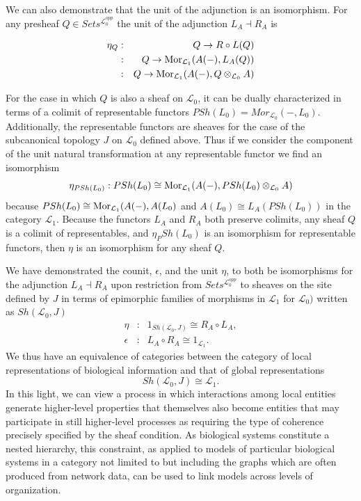 \documentclass[aps,twocolumn]{revtex4-1}
\begin{document}
We can also demonstrate that the unit of the adjunction is an isomorphism. For any presheaf $Q \in Sets^{\mathcal{L}_0^{opp}}$ the unit of the adjunction $L_A \dashv R_A$ is 

\begin{eqnarray*}
\eta_{Q} &:& Q \rightarrow R \circ L(Q)\\
&:& Q \rightarrow \mathop{\rm Mor}\nolimits_{\mathcal{L}_1}(A(-),L_A(Q))\\ 
&:& Q \rightarrow \mathop{\rm Mor}\nolimits_{\mathcal{L}_1}(A(-), Q \otimes_{\mathcal{L}_0} A)
\end{eqnarray*}

For the case in which $Q$ is also a sheaf on $\mathcal{L}_0$, it can be dually characterized in terms of a colimit of representable functors $PSh(L_0) = Mor_{\mathcal{L}_0}(-,L_0)$. Additionally, the representable functors are sheaves for the case of the subcanonical topology $J$ on $\mathcal{L}_0$ defined above. Thus if we consider the component of the unit natural transformation at any representable functor we find an isomorphism
$$
\eta_{PSh(L_0)}: PSh(L_0) \cong \mathop{\rm Mor}\nolimits_{\mathcal{L}_1}(A(-), PSh(L_0) \otimes_{\mathcal{L}_0} A)
$$
because $PSh(L_0) \cong \mathop{\rm Mor}\nolimits_{\mathcal{L}_1}(A(-), A(L_0)$ and $A(L_0) \cong L_A(PSh(L_0))$ in the category $\mathcal{L}_1$. Because the functors $L_A$ and $R_A$ both preserve colimits, any sheaf $Q$ is a colimit of representables, and $\eta_PSh(L_0)$ is an isomorphism for representable functors, then $\eta$ is an isomorphism for any sheaf $Q$.

We have demonstrated the counit, $\epsilon$, and the unit $\eta$, to both be isomorphisms for the adjunction $L_A \dashv R_A$ upon restriction from $Sets^{\mathcal{L}_0^{opp}}$ to sheaves on the site defined by $J$ in terms of epimorphic families of morphisms in $\mathcal{L}_1$ for $\mathcal{L}_0)$ written as $Sh(\mathcal{L}_0,J)$ 
\begin{eqnarray*}
\eta &:& 1_{Sh(\mathcal{L}_0,J)} \cong R_A \circ L_A,\\
\epsilon &:& L_A \circ R_A \cong 1_{\mathcal{L}_1}.
\end{eqnarray*}
We thus have an equivalence of categories between the category of local representations of biological information and that of global representations
$$
Sh(\mathcal{L}_0,J) \cong \mathcal{L}_1.
$$
In this light, we can view a process in which interactions among local entities generate higher-level properties that themselves also become entities that may participate in still higher-level processes as requiring the type of coherence precisely specified by the sheaf condition. As biological systems constitute a nested hierarchy, this constraint, as applied to models of particular biological systems in a category not limited to but including the graphs which are often produced from network data, can be used to link models across levels of organization.
 
\end{document}
